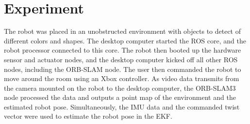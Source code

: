 \section{Experiment}

The robot was placed in an unobstructed environment with objects to detect of different colors and shapes. The desktop computer started the ROS core, and the robot processor connected to this core. The robot then booted up the hardware sensor and actuator nodes, and the desktop computer kicked off all other ROS nodes, including the ORB-SLAM node. The user then commanded the robot to move around the room using an Xbox controller. As video data transmits from the camera mounted on the robot to the desktop computer, the ORB-SLAM3 node processed the data and outputs a point map of the environment and the estimated robot pose. Simultaneously, the IMU data and the commanded twist vector were used to estimate the robot pose in the EKF.